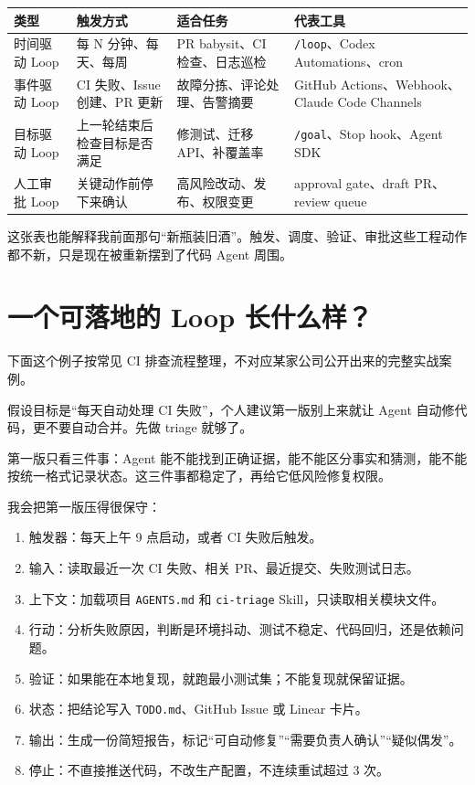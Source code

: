 \documentclass[10pt,a4paper]{ctexart}
\begin{document}
{\footnotesize
\begin{tabularx}{\textwidth}{|X|X|X|X|}
\hline
\textbf{类型} & \textbf{触发方式} & \textbf{适合任务} & \textbf{代表工具} \\
\hline
时间驱动 Loop & 每 N 分钟、每天、每周 & PR babysit、CI 检查、日志巡检 & \texttt{/loop}、Codex Automations、cron \\
\hline
事件驱动 Loop & CI 失败、Issue 创建、PR 更新 & 故障分拣、评论处理、告警摘要 & GitHub Actions、Webhook、Claude Code Channels \\
\hline
目标驱动 Loop & 上一轮结束后检查目标是否满足 & 修测试、迁移 API、补覆盖率 & \texttt{/goal}、Stop hook、Agent SDK \\
\hline
人工审批 Loop & 关键动作前停下来确认 & 高风险改动、发布、权限变更 & approval gate、draft PR、review queue \\
\hline
\end{tabularx}
}



这张表也能解释我前面那句“新瓶装旧酒”。触发、调度、验证、审批这些工程动作都不新，只是现在被重新摆到了代码 Agent 周围。



\section{一个可落地的 Loop 长什么样？}


下面这个例子按常见 CI 排查流程整理，不对应某家公司公开出来的完整实战案例。



假设目标是“每天自动处理 CI 失败”，个人建议第一版别上来就让 Agent 自动修代码，更不要自动合并。先做 triage 就够了。



第一版只看三件事：Agent 能不能找到正确证据，能不能区分事实和猜测，能不能按统一格式记录状态。这三件事都稳定了，再给它低风险修复权限。



我会把第一版压得很保守：


\begin{enumerate}[itemsep=2pt, topsep=4pt]
  \item 触发器：每天上午 9 点启动，或者 CI 失败后触发。
  \item 输入：读取最近一次 CI 失败、相关 PR、最近提交、失败测试日志。
  \item 上下文：加载项目 \texttt{AGENTS.md} 和 \texttt{ci-triage} Skill，只读取相关模块文件。
  \item 行动：分析失败原因，判断是环境抖动、测试不稳定、代码回归，还是依赖问题。
  \item 验证：如果能在本地复现，就跑最小测试集；不能复现就保留证据。
  \item 状态：把结论写入 \texttt{TODO.md}、GitHub Issue 或 Linear 卡片。
  \item 输出：生成一份简短报告，标记“可自动修复”“需要负责人确认”“疑似偶发”。
  \item 停止：不直接推送代码，不改生产配置，不连续重试超过 3 次。
\end{enumerate}
\end{document}
